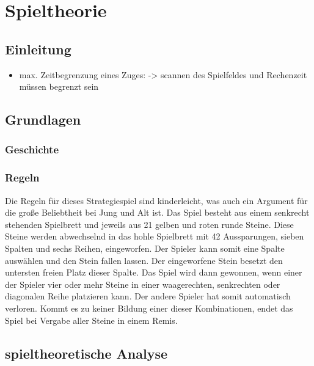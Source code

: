 \chapter{Spieltheorie}
\label{cha:Grundlagen}


\section{Einleitung}
\begin{itemize}
	\item max. Zeitbegrenzung eines Zuges: -> scannen des Spielfeldes und Rechenzeit müssen begrenzt sein
\end{itemize}
\section{Grundlagen}
\subsection{Geschichte}
\subsection{Regeln}
Die Regeln für dieses Strategiespiel sind kinderleicht, was auch ein Argument für die große Beliebtheit bei Jung und Alt ist. Das Spiel besteht aus einem senkrecht stehenden Spielbrett und jeweils aus 21 gelben und roten runde Steine. Diese Steine werden abwechselnd in das hohle Spielbrett mit 42 Aussparungen, sieben Spalten und sechs Reihen, eingeworfen. Der Spieler kann somit eine Spalte auswählen und den Stein fallen lassen. Der eingeworfene Stein besetzt den untersten freien Platz dieser Spalte. Das Spiel wird dann gewonnen, wenn einer der Spieler vier oder mehr Steine in einer waagerechten, senkrechten oder diagonalen Reihe platzieren kann. Der andere Spieler hat somit automatisch verloren. Kommt es zu keiner Bildung einer dieser Kombinationen, endet das Spiel bei Vergabe aller Steine in einem Remis.

\section{spieltheoretische Analyse}
